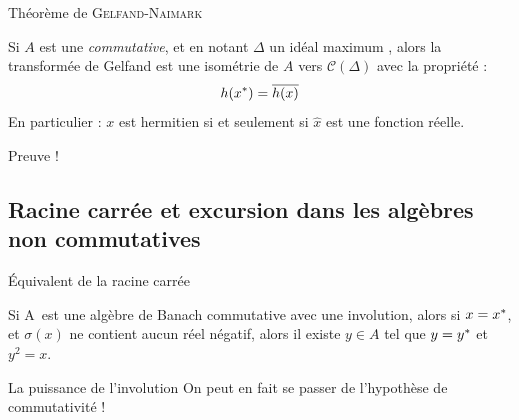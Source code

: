\documentclass[11pt, xcolor=table]{beamer}
\begin{document}
\begin{frame}{Théorème de \textsc{Gelfand}-\textsc{Naimark}}
    \begin{myth}
        Si $A$ est une \Calg \emph{commutative}, et en notant $\Delta$ un idéal maximum , alors la transformée de Gelfand est une isométrie de $A$ vers $\mathcal{C}(\Delta)$
        avec la propriété :
        \[
            h(x^\ast) = \overline{h(x)}
        \]
        En particulier : $x$ est hermitien si et seulement si $\hat{x}$ est une fonction réelle.
    \end{myth}
    \pause 
    Preuve !
\end{frame}

\subsection{Racine carrée et excursion dans les algèbres non commutatives}

\begin{frame}{Équivalent de la racine carrée}
    \begin{myth}
        Si A est une algèbre de Banach commutative avec une involution, alors si $x = x^\ast$, et $\sigma(x)$ ne contient aucun
        réel négatif, alors il existe $y \in A$ tel que $y = y^\ast$ et $y^2 = x$.
    \end{myth}

    \pause 

    \begin{alertblock}{La puissance de l'involution}
        On peut en fait se passer de l'hypothèse de commutativité !
    \end{alertblock}
\end{frame}


\end{document}
